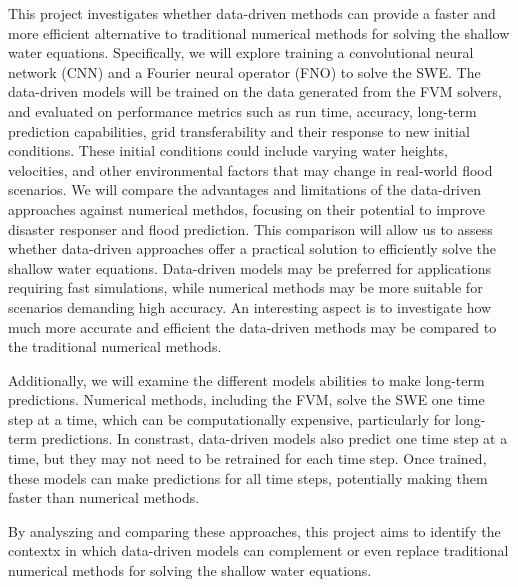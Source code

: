 This project investigates whether data-driven methods can provide a faster and more efficient alternative to traditional numerical methods for solving the shallow water equations.
Specifically, we will explore training a convolutional neural network (CNN) and a Fourier neural operator (FNO) to solve the SWE.
The data-driven models will be trained on the data generated from the FVM solvers, and evaluated on performance metrics such as run time, accuracy, long-term prediction capabilities, grid transferability and their response to new initial conditions.
These initial conditions could include varying water heights, velocities, and other environmental factors that may change in real-world flood scenarios.
We will compare the advantages and limitations of the data-driven approaches against numerical methdos, focusing on their potential to improve disaster responser and flood prediction.%
This comparison will allow us to assess whether data-driven approaches offer a practical solution to efficiently solve the shallow water equations.
Data-driven models may be preferred for applications requiring fast simulations, while numerical methods may be more suitable for scenarios demanding high accuracy.
An interesting aspect is to investigate how much more accurate and efficient the data-driven methods may be compared to the traditional numerical methods.

Additionally, we will examine the different models abilities to make long-term predictions.
Numerical methods, including the FVM, solve the SWE one time step at a time, which can be computationally expensive, particularly for long-term predictions.
In constrast, data-driven models also predict one time step at a time, but they may not need to be retrained for each time step.
Once trained, these models can make predictions for all time steps, potentially making them faster than numerical methods.

By analyszing and comparing these approaches, this project aims to identify the contextx in which data-driven models can complement or even replace traditional numerical methods for solving the shallow water equations.

